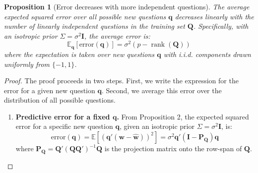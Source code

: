 \documentclass[\ifdraft draft\fi]{article}
\newtheorem{proposition}{Proposition}
\begin{document}
\begin{proposition}[Error decreases with more independent questions]
The average expected squared error over all possible new questions $\bm{q}$ decreases linearly with the number of linearly independent questions in the training set $\bm{Q}$. Specifically, with an isotropic prior $\Sigma = \sigma^2 \bm{I}$, the average error is:
      \[\mathbb{E}_{\bm{q}}[\text{error}(\bm{q})] = \sigma^2 (p - \operatorname{rank}(\bm{Q}))\]
   where the expectation is taken over new questions $\bm{q}$ with i.i.d. components drawn uniformly from $\{-1,1\}$.
\end{proposition}
\begin{greyproof}
\begin{proof}
The proof proceeds in two steps. First, we write the expression for the error for a given new question $\bm q$. Second, we average this error over the distribution of all possible questions.

\begin{enumerate}
    \item  \textbf{Predictive error for a fixed $\bm q$.} From Proposition 2, the expected squared error for a specific new question $\bm q$, given an isotropic prior $\Sigma = \sigma^2 \bm{I}$, is:
    \[
       \text{error}(\bm q) = \mathbb{E}[(\bm q'(\bm w - \hat{\bm w}))^2] = \sigma^2 \bm q'(\bm{I}-\bm{P_Q})\bm q
    \]
    where $\bm{P_Q} = \bm{Q}'(\bm{Q}\bm{Q}')^{-1}\bm{Q}$ is the projection matrix onto the row-span of $\bm{Q}$.


\end{enumerate}
\end{proof}
\end{greyproof}
\end{document}
